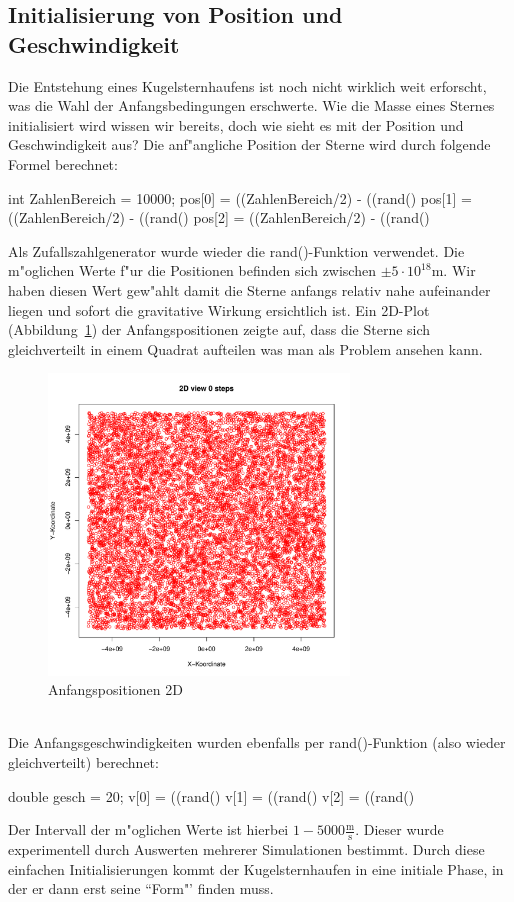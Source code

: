 \begin{refsection}
	\subsection{Initialisierung von Position und Geschwindigkeit \label{kugel:subsection:InitPosGesch}}
	Die Entstehung eines Kugelsternhaufens ist noch nicht wirklich weit erforscht, was die Wahl der Anfangsbedingungen erschwerte. Wie die Masse eines Sternes initialisiert wird wissen wir bereits, doch wie sieht es mit der Position und Geschwindigkeit aus? Die anf"angliche Position der Sterne wird durch folgende Formel berechnet:
\begin{Cpp}
int ZahlenBereich = 10000;
pos[0] = ((ZahlenBereich/2) - ((rand()%
pos[1] = ((ZahlenBereich/2) - ((rand()%
pos[2] = ((ZahlenBereich/2) - ((rand()%
\end{Cpp}
	Als Zufallszahlgenerator wurde wieder die rand()-Funktion verwendet. Die m"oglichen Werte f"ur die Positionen befinden sich zwischen $\mathrm{\pm5 \cdot 10^{18} m}$. Wir haben diesen Wert gew"ahlt damit die Sterne anfangs relativ nahe aufeinander liegen und sofort die gravitative Wirkung ersichtlich ist. Ein 2D-Plot (Abbildung~\ref{Kugel:Anfangspossition}) der Anfangspositionen zeigte auf, dass die Sterne sich gleichverteilt in einem Quadrat aufteilen was man als Problem ansehen kann.\\
	\begin{figure}[h!]
		\begin{center}
			\includegraphics[width = 8cm]{kugel/images/2DPosN0.pdf}
		\end{center}
		\caption{Anfangspositionen 2D
		\label{Kugel:Anfangspossition}}
	\end{figure}\\
	Die Anfangsgeschwindigkeiten wurden ebenfalls per rand()-Funktion (also wieder gleichverteilt) berechnet:
\begin{Cpp}	
double gesch = 20;
v[0] = ((rand()%
v[1] = ((rand()%
v[2] = ((rand()%
\end{Cpp}
    Der Intervall der m"oglichen Werte ist hierbei $\mathrm{1 - 5000 \frac{m}{s}}$. Dieser wurde experimentell durch Auswerten mehrerer Simulationen bestimmt. Durch diese einfachen Initialisierungen kommt der Kugelsternhaufen in eine initiale Phase, in der er dann erst seine ``Form"' finden muss.    
	

\end{refsection}
